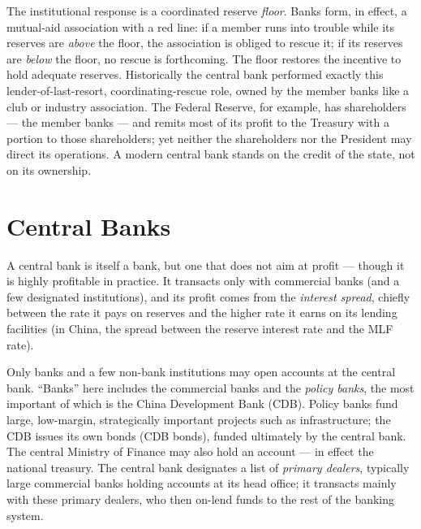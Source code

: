 \begin{remark}
The institutional response is a coordinated reserve \emph{floor}. Banks form, in effect, a mutual-aid association with a red line: if a member runs into trouble while its reserves are \emph{above} the floor, the association is obliged to rescue it; if its reserves are \emph{below} the floor, no rescue is forthcoming. The floor restores the incentive to hold adequate reserves. Historically the central bank performed exactly this lender-of-last-resort, coordinating-rescue role, owned by the member banks like a club or industry association. The Federal Reserve, for example, has shareholders --- the member banks --- and remits most of its profit to the Treasury with a portion to those shareholders; yet neither the shareholders nor the President may direct its operations. A modern central bank stands on the credit of the state, not on its ownership.
\end{remark}

\section{Central Banks}

A central bank is itself a bank, but one that does not aim at profit --- though it is highly profitable in practice. It transacts only with commercial banks (and a few designated institutions), and its profit comes from the \emph{interest spread}, chiefly between the rate it pays on reserves and the higher rate it earns on its lending facilities (in China, the spread between the reserve interest rate and the MLF rate).

\begin{remark}
Only banks and a few non-bank institutions may open accounts at the central bank. ``Banks'' here includes the commercial banks and the \emph{policy banks}, the most important of which is the China Development Bank (CDB). Policy banks fund large, low-margin, strategically important projects such as infrastructure; the CDB issues its own bonds (CDB bonds), funded ultimately by the central bank. The central Ministry of Finance may also hold an account --- in effect the national treasury. The central bank designates a list of \emph{primary dealers}, typically large commercial banks holding accounts at its head office; it transacts mainly with these primary dealers, who then on-lend funds to the rest of the banking system.
\end{remark}

